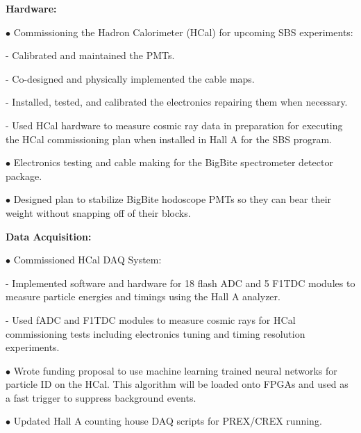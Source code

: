 \documentclass[letterpaper,10pt]{article}
\renewenvironment{itemize}{
  \begin{list}{}{
    \setlength{\leftmargin}{1.5em}
  }
}{
  \end{list}
}
\begin{document}
{\begin{itemize}
\begin{itemize}
		\item \textbf{Hardware:}
			\begin{itemize}\itemsep5pt
				\item $\bullet$ Commissioning the Hadron Calorimeter (HCal) for upcoming SBS experiments:
					\begin{itemize}\itemsep2pt
						\item - Calibrated and maintained the PMTs.
						\item - Co-designed and physically implemented the cable maps. 
						\item - Installed, tested, and calibrated the electronics repairing them when necessary.
						\item - Used HCal hardware to measure cosmic ray data in preparation for executing the HCal commissioning plan when installed in Hall A for the SBS program. 
					\end{itemize}
				\item $\bullet$ Electronics testing and cable making for the BigBite spectrometer detector package.
				\item $\bullet$ Designed plan to stabilize BigBite hodoscope PMTs so they can bear their weight without snapping off of their blocks. 
			\end{itemize}
			
		\item \textbf{Data Acquisition:}
			\begin{itemize}\itemsep5pt
				\item $\bullet$ Commissioned HCal DAQ System:
					\begin{itemize}\itemsep2pt
						\item - Implemented software and hardware for 18 flash ADC and 5 F1TDC modules to measure particle energies and timings using the Hall A analyzer.
						\item - Used fADC and F1TDC modules to measure cosmic rays for HCal commissioning tests including electronics tuning and timing resolution experiments. 
					\end{itemize}
				\item $\bullet$ Wrote funding proposal to use machine learning trained neural networks for particle ID on the HCal. This algorithm will be loaded onto FPGAs and used as a fast trigger to suppress background events.
				\item $\bullet$ Updated Hall A counting house DAQ scripts for PREX/CREX running.
			\end{itemize}
			

\end{itemize}
\end{itemize}}
\end{document}
